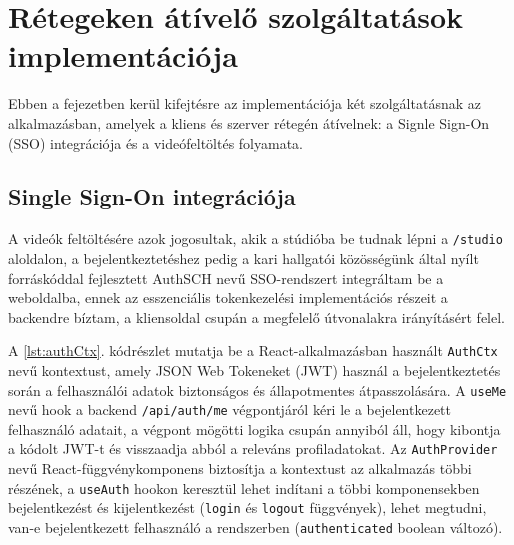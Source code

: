 \chapter{Rétegeken átívelő szolgáltatások implementációja}

Ebben a fejezetben kerül kifejtésre az implementációja két szolgáltatásnak az alkalmazásban, amelyek a kliens és szerver rétegén átívelnek: a Signle Sign-On (SSO) integrációja és a videófeltöltés folyamata.

\section{Single Sign-On integrációja}

A videók feltöltésére azok jogosultak, akik a stúdióba be tudnak lépni a \verb|/studio| aloldalon, a bejelentkeztetéshez pedig a kari hallgatói közösségünk által nyílt forráskóddal fejlesztett AuthSCH nevű SSO-rendszert integráltam be a weboldalba, ennek az esszenciális tokenkezelési implementációs részeit a backendre bíztam, a kliensoldal csupán a megfelelő útvonalakra irányításért felel.

A \ref{lst:authCtx}. kódrészlet mutatja be a React-alkalmazásban használt \verb|AuthCtx| nevű kontextust, amely JSON Web Tokeneket (JWT)\cite{jwt} használ a bejelentkeztetés során a felhasználói adatok biztonságos és állapotmentes átpasszolására. A \verb|useMe| nevű hook a backend \verb|/api/auth/me| végpontjáról kéri le a bejelentkezett felhasználó adatait, a végpont mögötti logika csupán annyiból áll, hogy kibontja a kódolt JWT-t és visszaadja abból a releváns profiladatokat. Az \verb|AuthProvider| nevű React-függvénykomponens biztosítja a kontextust az alkalmazás többi részének, a \verb|useAuth| hookon keresztül lehet indítani a többi komponensekben bejelentkezést és kijelentkezést (\verb|login| és \verb|logout| függvények), lehet megtudni, van-e bejelentkezett felhasználó a rendszerben (\verb|authenticated| boolean változó).

